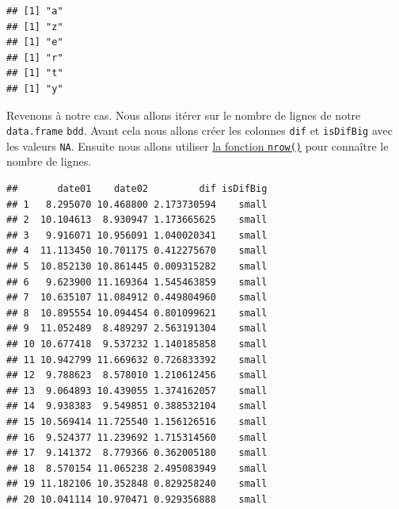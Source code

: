 \documentclass[
]{book}
\newenvironment{Shaded}{\begin{snugshade}}{\end{snugshade}}
\newcommand{\ControlFlowTok}[1]{\textcolor[rgb]{0.13,0.29,0.53}{\textbf{#1}}}
\newcommand{\DataTypeTok}[1]{\textcolor[rgb]{0.13,0.29,0.53}{#1}}
\newcommand{\DecValTok}[1]{\textcolor[rgb]{0.00,0.00,0.81}{#1}}
\newcommand{\KeywordTok}[1]{\textcolor[rgb]{0.13,0.29,0.53}{\textbf{#1}}}
\newcommand{\NormalTok}[1]{#1}
\newcommand{\OperatorTok}[1]{\textcolor[rgb]{0.81,0.36,0.00}{\textbf{#1}}}
\newcommand{\OtherTok}[1]{\textcolor[rgb]{0.56,0.35,0.01}{#1}}
\newcommand{\StringTok}[1]{\textcolor[rgb]{0.31,0.60,0.02}{#1}}
\begin{document}
\begin{verbatim}
## [1] "a"
## [1] "z"
## [1] "e"
## [1] "r"
## [1] "t"
## [1] "y"
\end{verbatim}

Revenons à notre cas. Nous allons itérer sur le nombre de lignes de notre \texttt{data.frame} \texttt{bdd}. Avant cela nous allons créer les colonnes \texttt{dif} et \texttt{isDifBig} avec les valeurs \texttt{NA}. Ensuite nous allons utiliser \protect\hyperlink{l015nrow}{la fonction \texttt{nrow()}} pour connaître le nombre de lignes.

\begin{Shaded}
\end{Shaded}

\begin{verbatim}
##       date01    date02         dif isDifBig
## 1   8.295070 10.468800 2.173730594    small
## 2  10.104613  8.930947 1.173665625    small
## 3   9.916071 10.956091 1.040020341    small
## 4  11.113450 10.701175 0.412275670    small
## 5  10.852130 10.861445 0.009315282    small
## 6   9.623900 11.169364 1.545463859    small
## 7  10.635107 11.084912 0.449804960    small
## 8  10.895554 10.094454 0.801099621    small
## 9  11.052489  8.489297 2.563191304    small
## 10 10.677418  9.537232 1.140185858    small
## 11 10.942799 11.669632 0.726833392    small
## 12  9.788623  8.578010 1.210612456    small
## 13  9.064893 10.439055 1.374162057    small
## 14  9.938383  9.549851 0.388532104    small
## 15 10.569414 11.725540 1.156126516    small
## 16  9.524377 11.239692 1.715314560    small
## 17  9.141372  8.779366 0.362005180    small
## 18  8.570154 11.065238 2.495083949    small
## 19 11.182106 10.352848 0.829258240    small
## 20 10.041114 10.970471 0.929356888    small
\end{verbatim}
\end{document}
